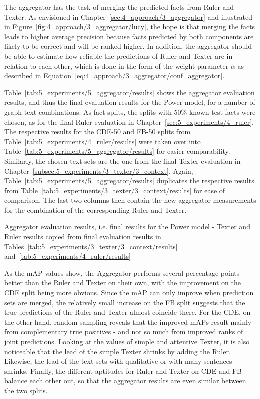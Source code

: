 The aggregator has the task of merging the predicted facts from Ruler and Texter. As envisioned in Chapter~\ref{sec:4_approach/3_aggregator} and illustrated in Figure~\ref{fig:4_approach/3_aggregator/lucy}, the hope is that merging the facts leads to higher average precision because facts predicted by both components are likely to be correct and will be ranked higher. In addition, the aggregator should be able to estimate how reliable the predictions of Ruler and Texter are in relation to each other, which is done in the form of the weight parameter $\alpha$ as described in Equation~\ref{eq:4_approach/3_aggregator/conf_aggregator}.

Table~\ref{tab:5_experiments/5_aggregator/results} shows the aggregator evaluation results, and thus the final evaluation results for the Power model, for a number of graph-text combinations. As fact splits, the splits with 50\% known test facts were chosen, as for the final Ruler evaluation in Chapter~\ref{sec:5_experiments/4_ruler}. The respective results for the CDE-50 and FB-50 splits from Table~\ref{tab:5_experiments/4_ruler/results} were taken over into Table~\ref{tab:5_experiments/5_aggregator/results} for easier comparability. Similarly, the chosen text sets are the one from the final Texter evaluation in Chapter~\ref{subsec:5_experiments/3_texter/3_context}. Again, Table~\ref{tab:5_experiments/5_aggregator/results} duplicates the respective results from Table~\ref{tab:5_experiments/3_texter/3_context/results} for ease of comparison. The last two columns then contain the new aggregator measurements for the combination of the corresponding Ruler and Texter.

\begin{table}[h]
    \makebox[\textwidth][c]{
        
    }
    \caption{Aggregator evaluation results, i.e. final results for the Power model - Texter and Ruler results copied from final evaluation results in Tables~\ref{tab:5_experiments/3_texter/3_context/results} and~\ref{tab:5_experiments/4_ruler/results}}
    \label{tab:5_experiments/5_aggregator/results}
\end{table}

As the mAP values show, the Aggregator performs several percentage points better than the Ruler and Texter on their own, with the improvement on the CDE split being more obvious. Since the mAP can only improve when prediction sets are merged, the relatively small increase on the FB split suggests that the true predictions of the Ruler and Texter almost coincide there. For the CDE, on the other hand, random sampling reveals that the improved mAPs result mainly from complementary true positives - and not so much from improved ranks of joint predictions. Looking at the values of simple and attentive Texter, it is also noticeable that the lead of the simple Texter shrinks by adding the Ruler. Likewise, the lead of the text sets with qualitative or with many sentences shrinks. Finally, the different aptitudes for Ruler and Texter on CDE and FB balance each other out, so that the aggregator results are even similar between the two splits.

